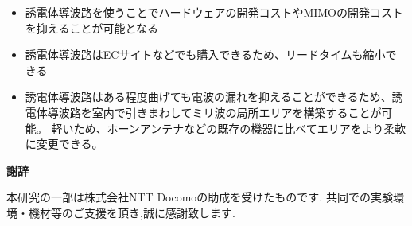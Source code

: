 \documentclass[technicalreport]{ieicej}
\begin{document}
\begin{itemize}
  \item 誘電体導波路を使うことでハードウェアの開発コストやMIMOの開発コストを抑えることが可能となる
  \item 誘電体導波路はECサイトなどでも購入できるため、リードタイムも縮小できる
  \item 誘電体導波路はある程度曲げても電波の漏れを抑えることができるため、誘電体導波路を室内で引きまわしてミリ波の局所エリアを構築することが可能。
  軽いため、ホーンアンテナなどの既存の機器に比べてエリアをより柔軟に変更できる。
\end{itemize}

\begin{center}
  \Large \textbf{謝辞}
\end{center}

本研究の一部は株式会社NTT Docomoの助成を受けたものです.
共同での実験環境・機材等のご支援を頂き,誠に感謝致します.

%
%

\end{document}
